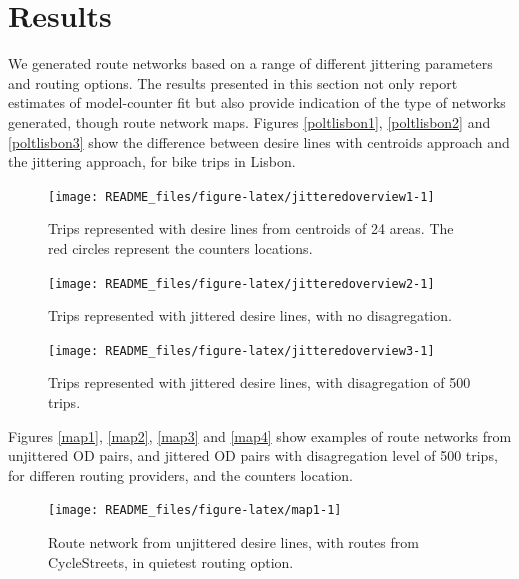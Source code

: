 \documentclass{isprs} %
\begin{document}
\hypertarget{results}{%
\section{Results}\label{results}}

We generated route networks based on a range of different jittering parameters and routing options.
The results presented in this section not only report estimates of model-counter fit but also provide indication of the type of networks generated, though route network maps.
Figures \ref{poltlisbon1}, \ref{poltlisbon2} and \ref{poltlisbon3} show the difference between desire lines with centroids approach and the jittering approach, for bike trips in Lisbon.

\begin{figure}

{\centering \texttt{[image: README\_files/figure-latex/jitteredoverview1-1]} 

}

\caption{\label{poltlisbon1}Trips represented with desire lines from centroids of 24 areas. The red circles represent the counters locations.}\label{fig:jitteredoverview1}
\end{figure}

\begin{figure}

{\centering \texttt{[image: README\_files/figure-latex/jitteredoverview2-1]} 

}

\caption{\label{poltlisbon2}Trips represented with jittered desire lines, with no disagregation.}\label{fig:jitteredoverview2}
\end{figure}

\begin{figure}

{\centering \texttt{[image: README\_files/figure-latex/jitteredoverview3-1]} 

}

\caption{\label{poltlisbon3}Trips represented with jittered desire lines, with disagregation of 500 trips.}\label{fig:jitteredoverview3}
\end{figure}

Figures \ref{map1}, \ref{map2}, \ref{map3} and \ref{map4} show examples of route networks from unjittered OD pairs, and jittered OD pairs with disagregation level of 500 trips, for differen routing providers, and the counters location.

\begin{figure}

{\centering \texttt{[image: README\_files/figure-latex/map1-1]} 

}

\caption{\label{map1}Route network from unjittered desire lines, with routes from CycleStreets, in quietest routing option.}\label{fig:map1}
\end{figure}
\end{document}
